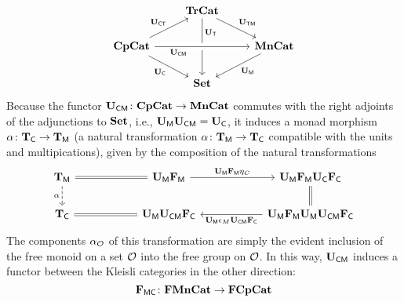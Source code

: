 \documentclass[12pt,oneside,article,draft]{memoir}
\begin{document}
\begin{equation*}
   \begin{tikzcd}
      & \TrCat \ar[dr,"\UTM"] \ar[dd,"\UT" near start] & \\
      \CompCat \ar[rr,crossing over,"\UCM"' near start] \ar[dr,"\UC"'] \ar[ru,"\UCT"]
         && \MonCat \ar[dl,"\UM"] \\
      & \Set &
   \end{tikzcd}
\end{equation*}
Because the functor $\mathbf{U}_{\mathsf{CM}}\colon\mathbf{CpCat}\to\mathbf{MnCat}$ commutes with the right adjoints of the
adjunctions to $\mathbf{Set}$, i.e., $\mathbf{U}_{\mathsf{M}}\mathbf{U}_{\mathsf{CM}}=\mathbf{U}_{\mathsf{C}}$, it induces a monad morphism $\alpha\colon\mathbf{T}_{\mathsf{C}}\to\mathbf{T}_{\mathsf{M}}$ (a natural transformation
$\alpha\colon\mathbf{T}_{\mathsf{M}}\to\mathbf{T}_{\mathsf{C}}$ compatible with the units and multipications), given by the composition of
the natural transformations
\begin{equation*}
	\begin{tikzcd}[column sep=2cm]
		\TM\ar[r,equal]\ar[d,dashed,"\alpha"']&\UM\FM\ar[r,"\UM\FM\eta_C"]&\UM\FM\UC\FC\ar[d,equal]\\
		\TC&\UM\UCM\FC\ar[l,equal]&\UM\FM\UM\UCM\FC\ar[l,"\UM\epsilon_M\UCM\FC"]
	\end{tikzcd}
\end{equation*}
The components $\alpha_{\mathcal{O}}$ of this transformation are simply the evident inclusion of the free monoid on a set
$\mathcal{O}$ into the free group on $\mathcal{O}$. In this way, $\mathbf{U}_{\mathsf{CM}}$ induces a functor between the Kleisli categories in the other direction:
\begin{equation}\label{eqn:FMC}
   \mathbf{F}_{\mathsf{MC}}\colon\mathbf{FMnCat}\to\mathbf{FCpCat}
\end{equation}

%
\end{document}
